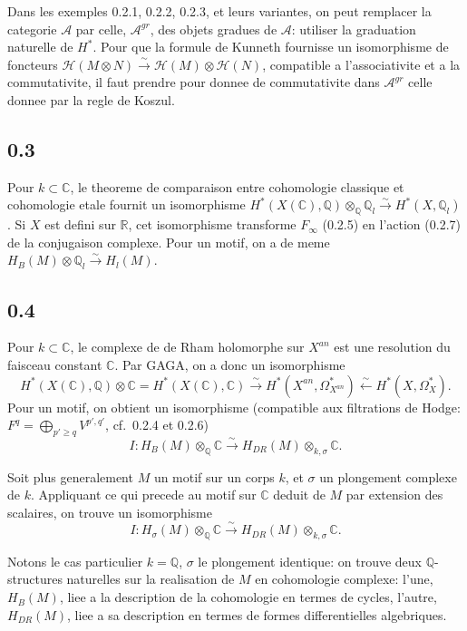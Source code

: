\documentclass[12pt,a4paper]{article}
\theoremstyle{plain}
\theoremstyle{definition}
\theoremstyle{remark}
\newcommand{\Q}{\mathbb{Q}}
\newcommand{\R}{\mathbb{R}}
\newcommand{\C}{\mathbb{C}}
\begin{document}
Dans les exemples 0.2.1, 0.2.2, 0.2.3, et leurs variantes, on peut remplacer la categorie
$\mathcal{A}$ par celle, $\mathcal{A}^{gr}$, des objets gradues de $\mathcal{A}$: utiliser la graduation naturelle de $H^*$.
Pour que la formule de Kunneth fournisse un isomorphisme de foncteurs
$\mathcal{H}(M \otimes N) \xrightarrow{\sim} \mathcal{H}(M) \otimes \mathcal{H}(N)$, compatible a l'associativite et a la
commutativite, il faut prendre pour donnee de commutativite dans $\mathcal{A}^{gr}$ celle donnee par
la regle de Koszul.

\subsection*{0.3}

Pour $k \subset \C$, le theoreme de comparaison entre cohomologie classique et
cohomologie etale fournit un isomorphisme
$H^*(X(\C), \Q) \otimes_{\Q} \Q_l \xrightarrow{\sim} H^*(X, \Q_l)$.
Si $X$ est defini sur $\R$, cet isomorphisme transforme $F_\infty$ (0.2.5) en l'action (0.2.7) de
la conjugaison complexe. Pour un motif, on a de meme $H_B(M) \otimes \Q_l \xrightarrow{\sim} H_l(M)$.

\subsection*{0.4}

Pour $k \subset \C$, le complexe de de Rham holomorphe sur $X^{an}$ est une resolution du
faisceau constant $\C$. Par GAGA, on a donc un isomorphisme
\[
H^*(X(\C), \Q) \otimes \C = H^*(X(\C), \C) \xrightarrow{\sim} H^*(X^{an}, \Omega_{X^{an}}^*) \xleftarrow{\sim} H^*(X, \Omega_X^*).
\]
Pour un motif, on obtient un isomorphisme (compatible aux filtrations de Hodge:
$F^q = \bigoplus_{p' \geq q} V^{p',q'}$, cf.~0.2.4 et 0.2.6)
\begin{equation}\label{eq:0.4.1}
I: H_B(M) \otimes_{\Q} \C \xrightarrow{\sim} H_{DR}(M) \otimes_{k,\sigma} \C.
\end{equation}

Soit plus generalement $M$ un motif sur un corps $k$, et $\sigma$ un plongement complexe de $k$.
Appliquant ce qui precede au motif sur $\C$ deduit de $M$ par extension des scalaires, on
trouve un isomorphisme
\[
I: H_\sigma(M) \otimes_{\Q} \C \xrightarrow{\sim} H_{DR}(M) \otimes_{k,\sigma} \C.
\]

Notons le cas particulier $k = \Q$, $\sigma$ le plongement identique: on trouve deux
$\Q$-structures naturelles sur la realisation de $M$ en cohomologie complexe: l'une,
$H_B(M)$, liee a la description de la cohomologie en termes de cycles, l'autre,
$H_{DR}(M)$, liee a sa description en termes de formes differentielles algebriques.
\end{document}

